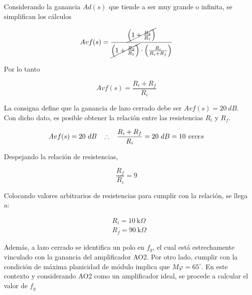 \hspace{1mm} Considerando la ganancia $Ad(s)$ que tiende a ser muy grande o infinita, se simplifican los cálculos

\begin{equation}
    Avf(s) = \frac{\cancel{\left(1+\frac{R_2}{R_1}\right)}}{\cancel{\left(1+\frac{R_2}{R_1}\right)} \cdot \left(\frac{R_i}{R_i+R_f}\right)} 
\end{equation}

\hspace{1mm} Por lo tanto

\begin{equation}
    \boxed{Avf(s)=\frac{R_i+R_f}{R_i}}
\end{equation}

 
\hspace{1mm} La consigna define que la ganancia de lazo cerrado debe ser $Avf(s)=20~dB$. Con dicho dato, es posible obtener la relación entre las resistencias $R_i$ y $R_f$.

\begin{equation}
    Avf(s)=20~dB \hspace{3mm} \therefore \hspace{3mm} \frac{R_i+R_f}{R_i}=20~dB = 10~veces
\end{equation}

 
\hspace{1mm} Despejando la relación de resistencias,

 
\begin{equation}
    \frac{R_f}{R_i} = 9
\end{equation}

 
\hspace{1mm} Colocando valores arbitrarios de resistencias para cumplir con la relación, se llega a:

\begin{equation}
    \boxed{
    \begin{aligned}
        &R_i=10~\text{k}\Omega \\
        &R_f=90~\text{k}\Omega
    \end{aligned}
    }
\end{equation}

 
\hspace{1mm} Además, a lazo cerrado se identifica un polo en $f_g$, el cual está estrechamente vinculado con la ganancia del amplificador AO2. Por otro lado, cumplir con la condición de máxima planicidad de módulo implica que $M\varphi =65^\circ$. En este contexto y considerando AO2 como un amplificador ideal, se procede a calcular el valor de $f_g$

